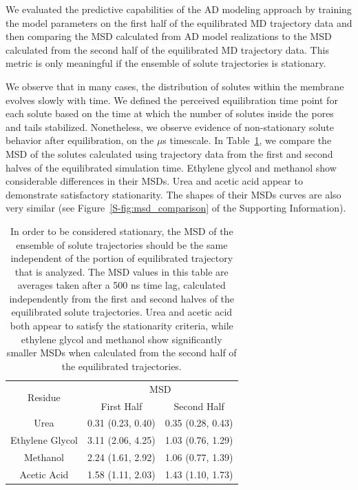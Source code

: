 \documentclass{article}
\begin{document}
  We evaluated the predictive capabilities of the AD modeling approach by training
  the model parameters on the first half of the equilibrated MD trajectory data and
  then comparing the MSD calculated from AD model realizations to the MSD calculated
  from the second half of the equilibrated MD trajectory data. This metric is
  only meaningful if the ensemble of solute trajectories is stationary.
  
  We observe that in many cases, the distribution of solutes within the membrane
  evolves slowly with time. We defined the perceived equilibration time point 
  for each solute based on the time at which the number of solutes inside the
  pores and tails stabilized. Nonetheless, we observe evidence of non-stationary
  solute behavior after equilibration, on the $\mu$s timescale. In Table~\ref{table:stationarity},
  we compare the MSD of the solutes calculated using trajectory data from the 
  first and second halves of the equilibrated simulation time. Ethylene glycol 
  and methanol show considerable differences in their MSDs. Urea and acetic acid
  appear to demonstrate satisfactory stationarity. The shapes of their MSDs curves
  are also very similar (see Figure~\ref{S-fig:msd_comparison} of the Supporting
  Information).
  
  \begin{table}[h]
  \centering
  \begin{tabular}{|c|c|c|}
  \hline
  \multirow{2}{*}{Residue} & \multicolumn{2}{c|}{MSD}            \\\cline{2-3}
                           & First Half       & Second Half      \\\hline
  Urea                     & 0.31 (0.23, 0.40)& 0.35 (0.28, 0.43)\\\hline
  Ethylene Glycol          & 3.11 (2.06, 4.25)& 1.03 (0.76, 1.29)\\\hline
  Methanol                 & 2.24 (1.61, 2.92)& 1.06 (0.77, 1.39)\\\hline
  Acetic Acid              & 1.58 (1.11, 2.03)& 1.43 (1.10, 1.73)\\\hline
  
  \end{tabular}
  \caption{In order to be considered stationary, the MSD of the ensemble of solute trajectories
  should be the same independent of the portion of equilibrated trajectory that is
  analyzed. The MSD values in this table are averages taken after a 500 ns time lag, 
  calculated independently from the first and second halves of the equilibrated
  solute trajectories. Urea and acetic acid both appear to satisfy the stationarity
  criteria, while ethylene glycol and methanol show significantly smaller MSDs 
  when calculated from the second half of the equilibrated trajectories.}\label{table:stationarity}
  \end{table}
  
\end{document}
